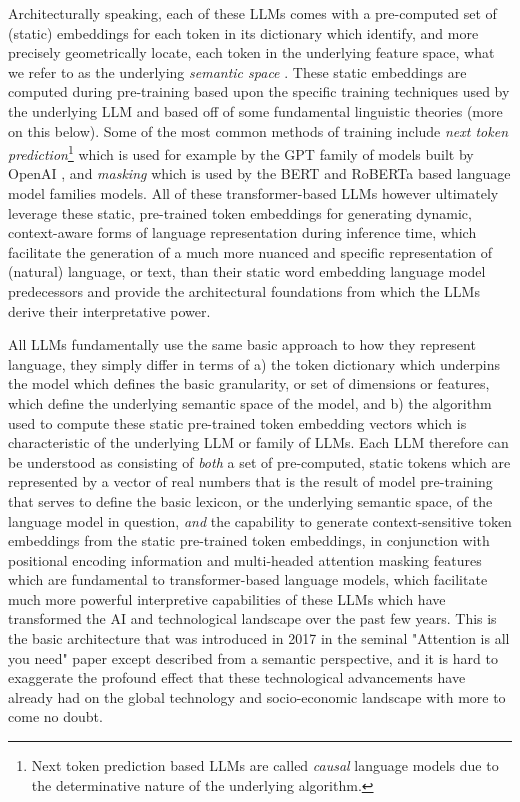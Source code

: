 \documentclass[final]{clv2025}
\begin{document}
Architecturally speaking, each of these LLMs comes with a pre-computed set of (static) embeddings for each token in its dictionary which identify, and more precisely geometrically locate, each token in the underlying feature space, what we refer to as the underlying \textit{semantic space} \cite{worth}. These static embeddings are computed during pre-training based upon the specific training techniques used by the underlying LLM and based off of some fundamental linguistic theories (more on this below). Some of the most common methods of training include \textit{next token prediction}\footnote{Next token prediction based LLMs are called \textit{causal} language models due to the determinative nature of the underlying algorithm.} which is used for example by the GPT family of models built by OpenAI \cite{radford2019language}, and \textit{masking} which is used by the BERT \cite{devlin-etal-2019-bert} and RoBERTa \cite{liu2019roberta} based language model families models. All of these transformer-based LLMs however ultimately leverage these static, pre-trained token embeddings for generating dynamic, context-aware forms of language representation during inference time, which facilitate the generation of a much more nuanced and specific representation of (natural) language, or text, than their static word embedding language model predecessors and provide the architectural foundations from which the LLMs derive their interpretative power. 

All LLMs fundamentally use the same basic approach to how they represent language, they simply differ in terms of a) the token dictionary which underpins the model which defines the basic granularity, or set of dimensions or features, which define the underlying semantic space of the model, and b) the algorithm used to compute these static pre-trained token embedding vectors which is characteristic of the underlying LLM or family of LLMs. Each LLM therefore can be understood as consisting of \textit{both} a set of pre-computed, static tokens which are represented by a vector of real numbers that is the result of model pre-training that serves to define the basic lexicon, or the underlying semantic space, of the language model in question, \textit{and} the capability to generate context-sensitive token embeddings from the static pre-trained token embeddings, in conjunction with positional encoding information and multi-headed attention masking features which are fundamental to transformer-based language models, which facilitate much more powerful interpretive capabilities of these LLMs which have transformed the AI and technological landscape over the past few years. This is the basic architecture that was introduced in 2017 in the seminal "Attention is all you need" paper \cite{vaswani} except described from a semantic perspective, and it is hard to exaggerate the profound effect that these technological advancements have already had on the global technology and socio-economic landscape with more to come no doubt.
\end{document}

